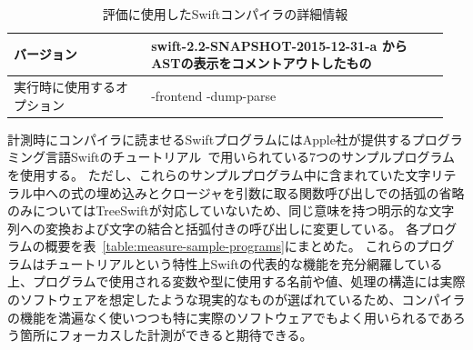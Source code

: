 \begin{table}[!hbtp]
    \begin{center}
        \caption{評価に使用したSwiftコンパイラの詳細情報}
        \begin{tabular}{|p{0.3\linewidth}|p{0.65\linewidth}|}
            \hline
            バージョン & swift-2.2-SNAPSHOT-2015-12-31-a からASTの表示をコメントアウトしたもの\\
            \hline
            実行時に使用するオプション & -frontend -dump-parse\\
            \hline
        \end{tabular}
        \label{table:complexity-measure}
    \end{center}
\end{table}

計測時にコンパイラに読ませるSwiftプログラムにはApple社が提供するプログラミング言語Swiftのチュートリアル~\cite{swift-tour}で用いられている7つのサンプルプログラムを使用する。
ただし、これらのサンプルプログラム中に含まれていた文字リテラル中への式の埋め込みとクロージャを引数に取る関数呼び出しでの括弧の省略のみについてはTreeSwiftが対応していないため、同じ意味を持つ明示的な文字列への変換および文字の結合と括弧付きの呼び出しに変更している。
各プログラムの概要を表~\ref{table:measure-sample-programs}にまとめた。
これらのプログラムはチュートリアルという特性上Swiftの代表的な機能を充分網羅している上、プログラムで使用される変数や型に使用する名前や値、処理の構造には実際のソフトウェアを想定したような現実的なものが選ばれているため、コンパイラの機能を満遍なく使いつつも特に実際のソフトウェアでもよく用いられるであろう箇所にフォーカスした計測ができると期待できる。

